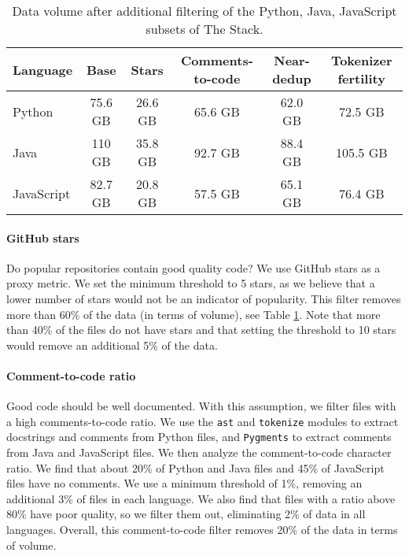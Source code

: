 \documentclass[10pt]{article} \usepackage{iclr2023_conference,times}
\begin{document}
\begin{table}[t]
\small
\begin{tabular}{lccccc}
\toprule
Language & Base & Stars & Comments-to-code & Near-dedup & Tokenizer fertility\\
\midrule
Python & 75.6 GB & 26.6 GB & 65.6 GB & 62.0 GB & \phantom{0}72.5 GB\\
Java & 110 GB & 35.8 GB & 92.7 GB & 88.4 GB & 105.5 GB \\
JavaScript & 82.7 GB & 20.8 GB & 57.5 GB & 65.1 GB & \phantom{0}76.4 GB\\
\bottomrule
\end{tabular}
\caption{Data volume after additional filtering of the Python, Java, JavaScript subsets of The Stack. } 
\label{tab:sizes}
\end{table}

\paragraph{GitHub stars} Do popular repositories contain good quality code? We use GitHub stars as a proxy metric. We set the minimum threshold to 5 stars, as we believe that a lower number of stars would not be an indicator of popularity. This filter removes more than 60\% of the data (in terms of volume), see Table \ref{tab:sizes}. Note that more than 40\% of the files do not have stars and that setting the threshold to 10 stars would remove an additional 5\% of the data. 

\paragraph{Comment-to-code ratio} Good code should be well documented. With this assumption, we filter files with a high comments-to-code ratio.
We use the \texttt{ast} and \texttt{tokenize} modules to extract docstrings and comments from Python files, and \texttt{Pygments} to extract comments from Java and JavaScript files. We then analyze the comment-to-code character ratio. We find that about 20\% of Python and Java files and 45\% of JavaScript files have no comments. We use a minimum threshold of 1\%, removing an additional 3\% of files in each language. We also find that files with a ratio above 80\% have poor quality, so we filter them out, eliminating 2\% of data in all languages. Overall, this comment-to-code filter removes 20\% of the data in terms of volume.
\end{document}
